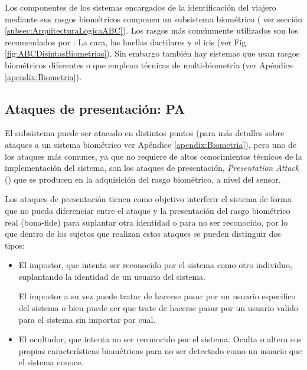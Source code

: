 Los componentes de los sistemas  encargados de la identificación del viajero mediante sus rasgos biométricos componen un subsistema biométrico ( ver sección \ref{subsec:ArquitecturaLogicaABC}). Los rasgos más comúnmente utilizados son los recomendados por  \cite{doc20069303}: La cara, las huellas dactilares y el \gls{iris} (ver Fig. \ref{fig:ABCDisintasBiometrias}). Sin embargo también hay sistemas que usan rasgos biométricos diferentes o que emplean técnicas de multi-biometría (ver Apéndice \ref{apendix:Biometria}).

\subsection{Ataques de presentación: PA}\label{subsec:AtaquesPresentacion}

El subsistema  puede ser atacado en distintos puntos (para más detalles sobre ataques a un sistema biométrico ver Apéndice \ref{apendix:Biometria}), pero uno de los ataques más comunes, ya que no requiere de altos conocimientos técnicos de la implementación del sistema, son los ataques de presentación, \textit{Presentation Attack} () que se producen en la adquisición del rasgo biométrico, a nivel del sensor.

Los ataques de presentación tienen como objetivo interferir el sistema de forma que no pueda diferenciar entre el ataque y la presentación del rasgo biométrico real (\gls{bona-fide}) para suplantar otra identidad o para no ser reconocido, por lo que dentro de los sujetos que realizan estos ataques se pueden distinguir dos tipos:

\begin{itemize}
    \item 
    El impostor, que intenta ser reconocido por el sistema como otro individuo, suplantando la identidad de un usuario del sistema.
    
    El impostor a su vez puede tratar de hacerse pasar por un usuario especifico del sistema o bien puede ser que trate de hacerse pasar por un usuario valido para el sistema sin importar por cual. 
    
    \item 
    El ocultador, que intenta no ser reconocido por el sistema. Oculta o altera sus propias características biométricas para no ser detectado como un usuario que el sistema conoce.
\end{itemize}

